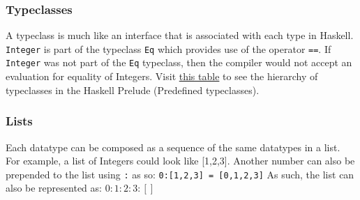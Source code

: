 \documentclass{article}
\begin{document}
        \begin{table}[]
            \centering
            \caption{Default Types}
            \label{tab:my-table}
        \end{table}
        
        \subsubsection{Typeclasses}
        A typeclass is much like an interface that is associated with each type in Haskell. \lstinline{Integer} is part of the typeclass \lstinline{Eq} which provides use of the operator \lstinline{==}. If \lstinline{Integer} was not part of the \lstinline{Eq} typeclass, then the compiler would not accept an evaluation for equality of Integers. Visit \href{https://www.haskell.org/onlinereport/haskell2010/haskell2x.png}{this table} to see the hierarchy of typeclasses in the Haskell Prelude (Predefined typeclasses).
        

        \subsubsection{Lists}
        Each datatype can be composed as a sequence of the same datatypes in a list. For example, a list of Integers could look like [1,2,3]. 
        \medskip
        Another number can also be prepended to the list using
        \lstinline{:} as so: \lstinline{0:[1,2,3] = [0,1,2,3]}
        \medskip
        As such, the list can also be represented as: $0:1:2:3:[]$
        
\end{document}

